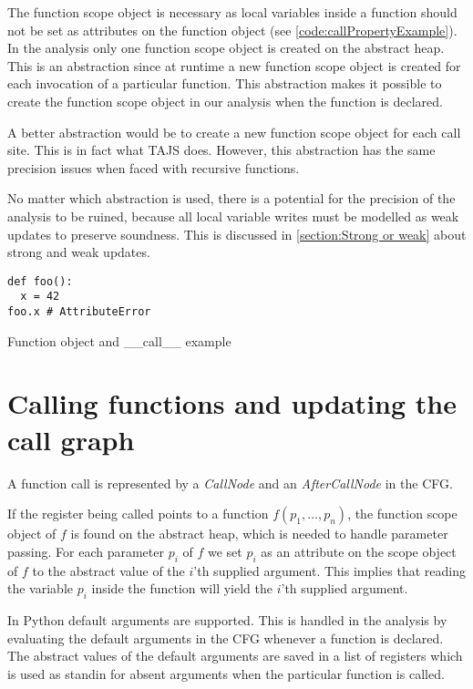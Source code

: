 The function scope object is necessary as local variables inside a function should not be set as attributes on the function object (see \autoref{code:callPropertyExample}). In the analysis only one function scope object is created on the abstract heap. This is an abstraction since at runtime a new function scope object is created for each invocation of a particular function. This abstraction makes it possible to create the function scope object in our analysis when the function is declared.

A better abstraction would be to create a new function scope object for each call site. This is in fact what TAJS \cite{tajs} does. However, this abstraction has the same precision issues when faced with recursive functions.

No matter which abstraction is used, there is a potential for the precision of the analysis to be ruined, because all local variable writes must be modelled as weak updates to preserve soundness. This is discussed in \autoref{section:Strong or weak} about strong and weak updates.

\begin{listing}[H]
	\begin{verbatim}
def foo(): 
  x = 42
foo.x # AttributeError
	\end{verbatim}
\caption{Function object and \_\_call\_\_ example}
\label{code:callPropertyExample}
\end{listing}


\section{Calling functions and updating the call graph}
A function call is represented by a \textit{CallNode} and an \textit{AfterCallNode} in the CFG.

If the register being called points to a function $f(p_1, ..., p_n)$, the function scope object of $f$ is found on the abstract heap, which is needed to handle parameter passing. For each parameter $p_i$ of $f$ we set $p_i$ as an attribute on the scope object of $f$ to the abstract value of the $i$'th supplied argument. This implies that reading the variable $p_i$ inside the function will yield the $i$'th supplied argument. 

In Python default arguments are supported. This is handled in the analysis by evaluating the default arguments in the CFG whenever a function is declared. The abstract values of the default arguments are saved in a list of registers which is used as standin for absent arguments when the particular function is called.

